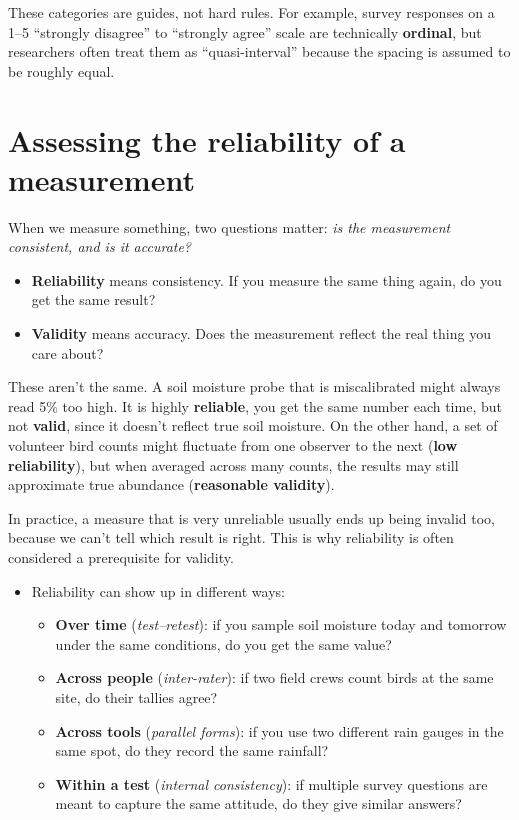 \documentclass[
  letterpaper,
  DIV=11,
  numbers=noendperiod]{scrreprt}
\begin{document}
These categories are guides, not hard rules. For example, survey
responses on a 1--5 ``strongly disagree'' to ``strongly agree'' scale
are technically \textbf{ordinal}, but researchers often treat them as
``quasi-interval'' because the spacing is assumed to be roughly equal.

\section{Assessing the reliability of a
measurement}\label{assessing-the-reliability-of-a-measurement}

When we measure something, two questions matter: \emph{is the
measurement consistent, and is it accurate?}

\begin{itemize}
\item
  \textbf{Reliability} means consistency. If you measure the same thing
  again, do you get the same result?
\item
  \textbf{Validity} means accuracy. Does the measurement reflect the
  real thing you care about?
\end{itemize}

These aren't the same. A soil moisture probe that is miscalibrated might
always read 5\% too high. It is highly \textbf{reliable}, you get the
same number each time, but not \textbf{valid}, since it doesn't reflect
true soil moisture. On the other hand, a set of volunteer bird counts
might fluctuate from one observer to the next (\textbf{low
reliability}), but when averaged across many counts, the results may
still approximate true abundance (\textbf{reasonable validity}).

In practice, a measure that is very unreliable usually ends up being
invalid too, because we can't tell which result is right. This is why
reliability is often considered a prerequisite for validity.

\begin{itemize}
\item
  Reliability can show up in different ways:

  \begin{itemize}
  \item
    \textbf{Over time} (\emph{test--retest}): if you sample soil
    moisture today and tomorrow under the same conditions, do you get
    the same value?
  \item
    \textbf{Across people} (\emph{inter-rater}): if two field crews
    count birds at the same site, do their tallies agree?
  \item
    \textbf{Across tools} (\emph{parallel forms}): if you use two
    different rain gauges in the same spot, do they record the same
    rainfall?
  \item
    \textbf{Within a test} (\emph{internal consistency}): if multiple
    survey questions are meant to capture the same attitude, do they
    give similar answers?
  \end{itemize}
\end{itemize}
\end{document}
